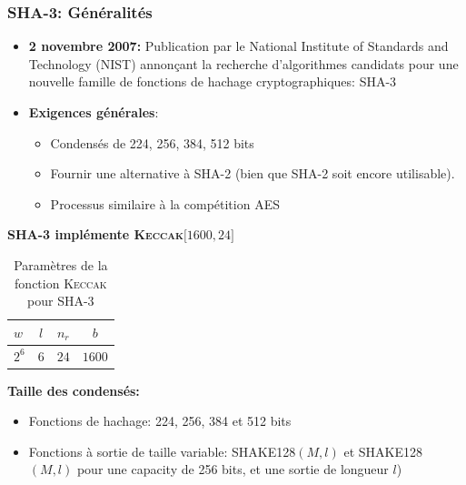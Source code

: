 \begin{frame}
  \frametitle{SHA-3: Généralités}
  \vfill
\begin{itemize}
\item{\textbf{2 novembre 2007:} Publication par le National Institute of         Standards and Technology (NIST) annonçant la recherche d'algorithmes candidats pour une nouvelle famille de fonctions de hachage cryptographiques: SHA-3}
  \vfill
        \item{
        \textbf{Exigences générales}:
                \begin{itemize}
                \item{Condensés de 224, 256, 384, 512 bits }
                \item{Fournir une alternative à SHA-2 (bien que SHA-2 soit encore                 utilisable).}
                \item{Processus similaire à la compétition AES}
                \end{itemize}
        }
\end{itemize}
\vfill
\end{frame}

\begin{frame}
\vfill
   
\centerline{\textbf{SHA-3 implémente \textsc{Keccak}$\lbrack 1600, 24 \rbrack$}}
 
\bgroup
\def\arraystretch{1.5}
  \begin{table}
\begin{tabular}{l | c | c | c }
$w$ & $l$ & $n_r$ & $b$ \\
\hline
$2^6$ & $6$ & $24$ & $1600 $ 
\end{tabular}
\caption{Paramètres de la fonction \textsc{Keccak} pour SHA-3}

\end{table}

\egroup

\vfill

\textbf{Taille des condensés:}
\begin{itemize}
\item{Fonctions de hachage: 224, 256, 384 et 512 bits}
\item{Fonctions à sortie de taille variable: \textsc{SHAKE128}$(M,l)$ et \textsc{SHAKE128}$(M,l)$  pour une capacity de 256 bits, et une sortie de longueur $l$) }
\end{itemize}
\vspace{1cm}
\vfill
\end{frame}
